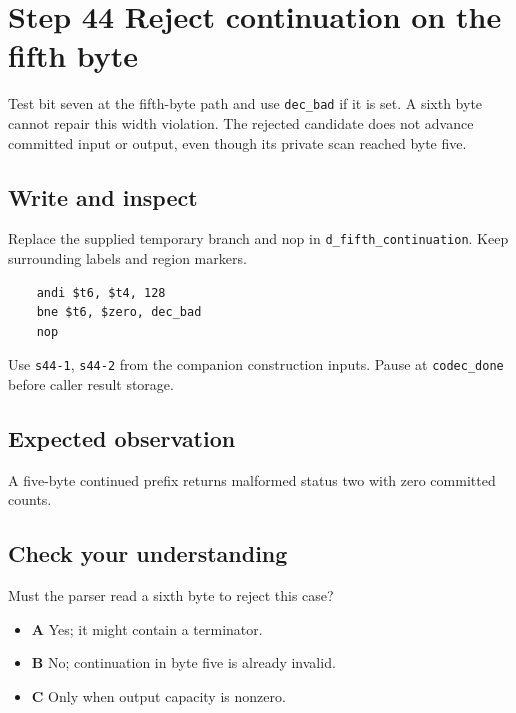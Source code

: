 \section{Step 44 Reject continuation on the fifth byte}\label{delta-s44}

Test bit seven at the fifth-byte path and use \texttt{dec\_bad} if it is set. A sixth byte cannot repair this width violation. The rejected candidate does not advance committed input or output, even though its private scan reached byte five.

\subsection{Write and inspect}
Replace the supplied temporary branch and nop in \texttt{d\_fifth\_continuation}. Keep surrounding labels and region markers.

\begin{verbatim}
    andi $t6, $t4, 128
    bne $t6, $zero, dec_bad
    nop
\end{verbatim}
Use \texttt{s44-1}, \texttt{s44-2} from the companion construction inputs. Pause at \texttt{codec\_done} before caller result storage.

\subsection{Expected observation}
A five-byte continued prefix returns malformed status two with zero committed counts.

\subsection{Check your understanding}
Must the parser read a sixth byte to reject this case?

\begin{itemize}
\item \textbf{A} Yes; it might contain a terminator.
\item \textbf{B} No; continuation in byte five is already invalid.
\item \textbf{C} Only when output capacity is nonzero.
\end{itemize}
